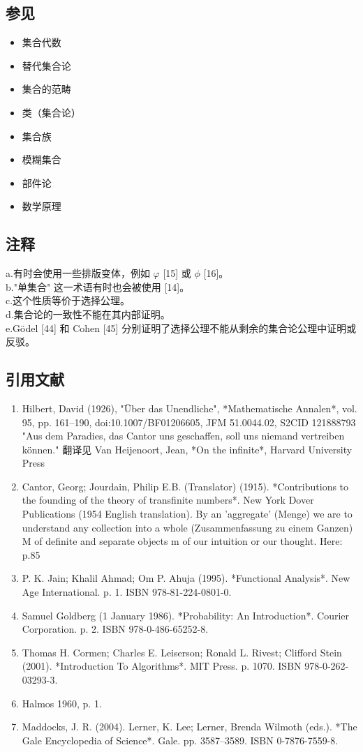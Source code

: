 \subsection{参见}
\begin{itemize}
\item 集合代数
\item 替代集合论
\item 集合的范畴
\item 类（集合论）
\item 集合族
\item 模糊集合
\item 部件论
\item 数学原理
\end{itemize}
\subsection{注释}

a.有时会使用一些排版变体，例如 \( \varphi \) [15] 或 \( \phi \) [16]。\\
b."单集合" 这一术语有时也会被使用 [14]。\\
c.这个性质等价于选择公理。\\
d.集合论的一致性不能在其内部证明。\\
e.Gödel [44] 和 Cohen [45] 分别证明了选择公理不能从剩余的集合论公理中证明或反驳。\\
\subsection{引用文献}
\begin{enumerate}
\item Hilbert, David (1926), "Über das Unendliche", *Mathematische Annalen*, vol. 95, pp. 161–190, doi:10.1007/BF01206605, JFM 51.0044.02, S2CID 121888793  
  "Aus dem Paradies, das Cantor uns geschaffen, soll uns niemand vertreiben können."  
  翻译见 Van Heijenoort, Jean, *On the infinite*, Harvard University Press
\item Cantor, Georg; Jourdain, Philip E.B. (Translator) (1915). *Contributions to the founding of the theory of transfinite numbers*. New York Dover Publications (1954 English translation). By an 'aggregate' (Menge) we are to understand any collection into a whole (Zusammenfassung zu einem Ganzen) M of definite and separate objects m of our intuition or our thought. Here: p.85  
\item P. K. Jain; Khalil Ahmad; Om P. Ahuja (1995). *Functional Analysis*. New Age International. p. 1. ISBN 978-81-224-0801-0.
\item Samuel Goldberg (1 January 1986). *Probability: An Introduction*. Courier Corporation. p. 2. ISBN 978-0-486-65252-8.  
\item Thomas H. Cormen; Charles E. Leiserson; Ronald L. Rivest; Clifford Stein (2001). *Introduction To Algorithms*. MIT Press. p. 1070. ISBN 978-0-262-03293-3.  
\item Halmos 1960, p. 1.  
\item Maddocks, J. R. (2004). Lerner, K. Lee; Lerner, Brenda Wilmoth (eds.). *The Gale Encyclopedia of Science*. Gale. pp. 3587–3589. ISBN 0-7876-7559-8.
\end{enumerate}
